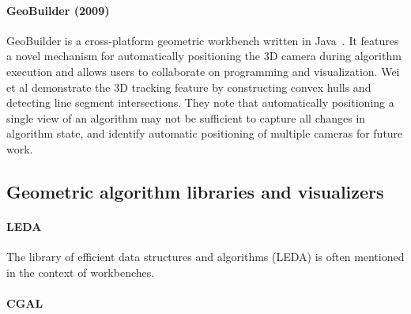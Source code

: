 




\paragraph{GeoBuilder (2009)}

GeoBuilder is a cross-platform geometric workbench written in
Java~\cite{wei2009geobuilder}. It features a novel mechanism for automatically
positioning the 3D camera during algorithm execution and allows users to
collaborate on programming and visualization. Wei et al demonstrate the 3D
tracking feature by constructing convex hulls and detecting line segment
intersections. They note that automatically positioning a single view of an
algorithm may not be sufficient to capture all changes in algorithm state, and
identify automatic positioning of multiple cameras for future work.

\subsection{Geometric algorithm libraries and visualizers}

\paragraph{LEDA}

The library of efficient data structures and algorithms (LEDA) is often
mentioned in the context of workbenches.

\paragraph{CGAL}

